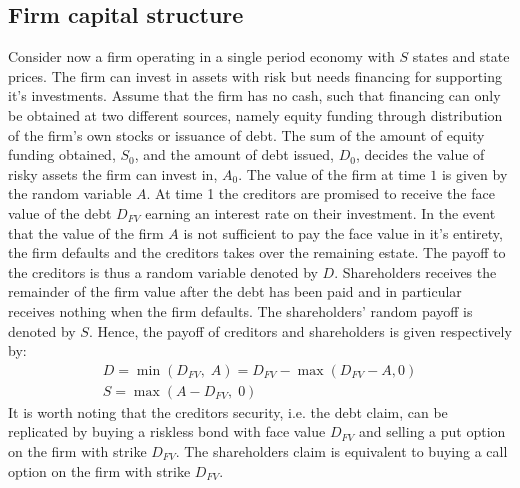 \documentclass[../main.tex]{subfiles}
\begin{document}
    \subsection{Firm capital structure}
        Consider now a firm operating in a single period economy with $S$ states and state prices. The firm can invest in assets with risk but needs financing for supporting it's investments. Assume that the firm has no cash, such that financing can only be obtained at two different sources, namely equity funding through distribution of the firm's own stocks or issuance of debt. The sum of the amount of equity funding obtained, $S_{0}$, and the amount of debt issued, $D_{0}$, decides the value of risky assets the firm can invest in, $A_{0}$. The value of the firm at time $1$ is given by the random variable $A$. At time 1 the creditors are promised to receive the face value of the debt $D_{FV}$ earning an interest rate on their investment. In the event that the value of the firm $A$ is not sufficient to pay the face value in it's entirety, the firm defaults and the creditors takes over the remaining estate. The payoff to the creditors is thus a random variable denoted by $D$. Shareholders receives the remainder of the firm value after the debt has been paid and in particular receives nothing when the firm defaults. The shareholders' random payoff is denoted by $S$. Hence, the payoff of creditors and shareholders is given respectively by:
            \begin{gather}
                D = \min\left(
                        D_{FV},\; A
                    \right)
                    = D_{FV} - \max\left(
                        D_{FV} - A, 0
                    \right) \label{eqn:legacy-creditor-payoff}\\
                S
                    = \max\left(
                        A - D_{FV},\; 0
                    \right)
            \end{gather}
        It is worth noting that the creditors security, i.e. the debt claim, can be replicated by buying a riskless bond with face value $D_{FV}$ and selling a put option on the firm with strike $D_{FV}$. The shareholders claim is equivalent to buying a call option on the firm with strike $D_{FV}$.
\end{document}
